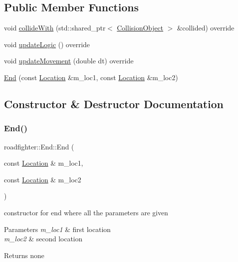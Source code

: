 \subsection*{Public Member Functions}
\begin{DoxyCompactItemize}
\item 
void \hyperlink{classroadfighter_1_1End_a56dfbe6f0c760a5728b58fc9d9f40486}{collide\+With} (std\+::shared\+\_\+ptr$<$ \hyperlink{classroadfighter_1_1CollisionObject}{Collision\+Object} $>$ \&collided) override
\item 
void \hyperlink{classroadfighter_1_1End_aee4a4fed3e7bd5f85f183351280e54f9}{update\+Logic} () override
\item 
void \hyperlink{classroadfighter_1_1End_a6ea4afe8b07f96801fb2a67b82d6b71c}{update\+Movement} (double dt) override
\item 
\hyperlink{classroadfighter_1_1End_ab5806203f3fb473a220b3cce19f2fb0c}{End} (const \hyperlink{classroadfighter_1_1Location}{Location} \&m\+\_\+loc1, const \hyperlink{classroadfighter_1_1Location}{Location} \&m\+\_\+loc2)
\end{DoxyCompactItemize}


\subsection{Constructor \& Destructor Documentation}
\mbox{\label{classroadfighter_1_1End_ab5806203f3fb473a220b3cce19f2fb0c}} 
\subsubsection{\texorpdfstring{End()}{End()}}
{\footnotesize\ttfamily roadfighter\+::\+End\+::\+End (\begin{DoxyParamCaption}\item[{const \hyperlink{classroadfighter_1_1Location}{Location} \&}]{m\+\_\+loc1,  }\item[{const \hyperlink{classroadfighter_1_1Location}{Location} \&}]{m\+\_\+loc2 }\end{DoxyParamCaption})}

constructor for end where all the parameters are given 
\begin{DoxyParams}{Parameters}
{\em m\+\_\+loc1} & first location \\
\hline
{\em m\+\_\+loc2} & second location \\
\hline
\end{DoxyParams}
\begin{DoxyReturn}{Returns}
none 
\end{DoxyReturn}

